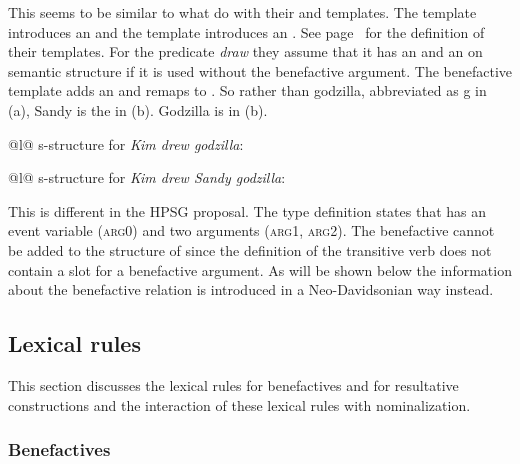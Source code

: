 This seems to be similar to what \citet{AGT2014a} do with their
 and  templates. The  template introduces an
\argone and the  template introduces an \argtwo. See page~\pageref{ex:agent-temp} for the
definition of their templates. For the predicate \emph{draw} they assume that it has an \argone and
an \argtwo on semantic structure if it is used without the benefactive argument. The benefactive
template adds an \argthree and remaps \argtwo to \argthree. So rather than godzilla, abbreviated as
g in (a), Sandy is the \argtwo in (b). Godzilla is \argthree in
(b).
\eal
\ex 
\begin{tabular}[t]{@{}l@{}}
s-structure for \emph{Kim drew godzilla}:\\ 
\end{tabular}
\ex
\begin{tabular}[t]{@{}l@{}}
s-structure for \emph{Kim drew Sandy godzilla}:\\
\end{tabular}
\zl
This is different in the HPSG proposal. The type definition states that  has an event
variable (\textsc{arg0}) and two arguments (\textsc{arg1}, \textsc{arg2}). The benefactive cannot be added to the
structure of  since the definition of the transitive verb  does not contain a slot for a benefactive argument. As will be shown below
the information about the benefactive relation is introduced in a Neo-Davidsonian way instead.   

\subsection{Lexical rules}

This section discusses the lexical rules for benefactives and for resultative constructions and the
interaction of these lexical rules with nominalization.

\subsubsection{Benefactives}

